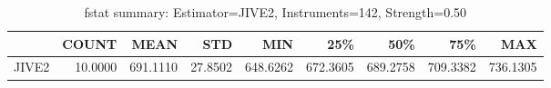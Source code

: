 \begin{table}[ht]
\centering
\caption{fstat summary: Estimator=JIVE2, Instruments=142, Strength=0.50}
\begin{tabular}{lrrrrrrrr}
\toprule
 & COUNT & MEAN & STD & MIN & 25\% & 50\% & 75\% & MAX \\
\midrule
JIVE2 & 10.0000 & 691.1110 & 27.8502 & 648.6262 & 672.3605 & 689.2758 & 709.3382 & 736.1305 \\
\bottomrule
\end{tabular}
\end{table}
